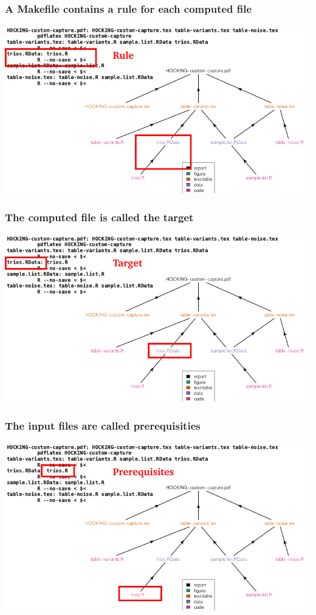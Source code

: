 \documentclass{beamer}
\begin{document}
\begin{frame}
  \frametitle{A Makefile contains a rule for each computed file}
  \includegraphics[width=\textwidth]{figure-code-dag-line3}
\end{frame}

\begin{frame}
  \frametitle{The computed file is called the target}
  \includegraphics[width=\textwidth]{figure-code-dag-line3-target}
\end{frame}

\begin{frame}
  \frametitle{The input files are called prerequisities}
  \includegraphics[width=\textwidth]{figure-code-dag-line3-prerequisites}
\end{frame}
\end{document}
